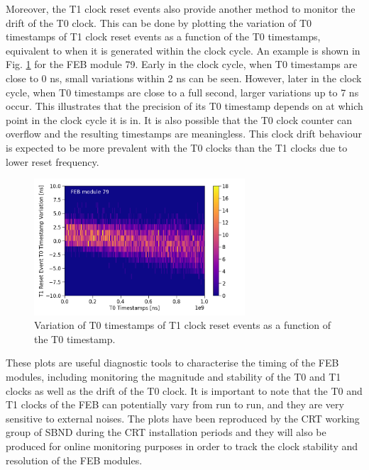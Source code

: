 Moreover, the T1 clock reset events also provide another method to monitor the drift of the T0 clock. 
This can be done by plotting the variation of T0 timestamps of T1 clock reset events as a function of the T0 timestamps, equivalent to when it is generated within the clock cycle.
An example is shown in Fig. \ref{fig:Board79T1Drift2d} for the FEB module 79.
Early in the clock cycle, when T0 timestamps are close to 0 ns, small variations within 2 ns can be seen.
However, later in the clock cycle, when T0 timestamps are close to a full second, larger variations up to 7 ns occur.
This illustrates that the precision of its T0 timestamp depends on at which point in the clock cycle it is in.
It is also possible that the T0 clock counter can overflow and the resulting timestamps are meaningless.
This clock drift behaviour is expected to be more prevalent with the T0 clocks than the T1 clocks due to lower reset frequency.

\begin{figure}[hb!] 
\centering    
\includegraphics[width=0.70\textwidth]{board79_T1drift_2d}
\caption[Variation of T0 Timestamps of T1 Clock Reset Events Against T0 Timestamp]{
Variation of T0 timestamps of T1 clock reset events as a function of the T0 timestamp. 
}
\label{fig:Board79T1Drift2d}
\end{figure}

These plots are useful diagnostic tools to characterise the timing of the FEB modules, including monitoring the magnitude and stability of the T0 and T1 clocks as well as the drift of the T0 clock.
It is important to note that the T0 and T1 clocks of the FEB can potentially vary from run to run, and they are very sensitive to external noises. 
The plots have been reproduced by the CRT working group of SBND during the CRT installation periods and they will also be produced for online monitoring purposes in order to track the clock stability and resolution of the FEB modules.


